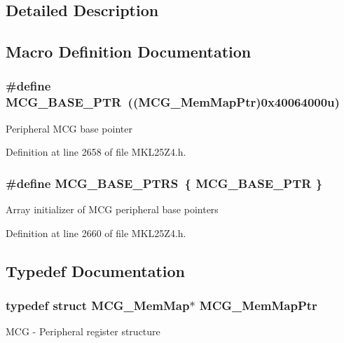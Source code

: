 \subsection{Detailed Description}


\subsection{Macro Definition Documentation}
\subsubsection[{\texorpdfstring{M\+C\+G\+\_\+\+B\+A\+S\+E\+\_\+\+P\+TR}{MCG_BASE_PTR}}]{\setlength{\rightskip}{0pt plus 5cm}\#define M\+C\+G\+\_\+\+B\+A\+S\+E\+\_\+\+P\+TR~(({\bf M\+C\+G\+\_\+\+Mem\+Map\+Ptr})0x40064000u)}\hypertarget{group___m_c_g___peripheral_gaceefc72e93a47a35f59a31c57dddf41b}{}\label{group___m_c_g___peripheral_gaceefc72e93a47a35f59a31c57dddf41b}
Peripheral M\+CG base pointer 

Definition at line 2658 of file M\+K\+L25\+Z4.\+h.

\subsubsection[{\texorpdfstring{M\+C\+G\+\_\+\+B\+A\+S\+E\+\_\+\+P\+T\+RS}{MCG_BASE_PTRS}}]{\setlength{\rightskip}{0pt plus 5cm}\#define M\+C\+G\+\_\+\+B\+A\+S\+E\+\_\+\+P\+T\+RS~\{ {\bf M\+C\+G\+\_\+\+B\+A\+S\+E\+\_\+\+P\+TR} \}}\hypertarget{group___m_c_g___peripheral_ga3e6aec328b7327acc1f7bff70bec388c}{}\label{group___m_c_g___peripheral_ga3e6aec328b7327acc1f7bff70bec388c}
Array initializer of M\+CG peripheral base pointers 

Definition at line 2660 of file M\+K\+L25\+Z4.\+h.



\subsection{Typedef Documentation}
\subsubsection[{\texorpdfstring{M\+C\+G\+\_\+\+Mem\+Map\+Ptr}{MCG_MemMapPtr}}]{\setlength{\rightskip}{0pt plus 5cm}typedef struct {\bf M\+C\+G\+\_\+\+Mem\+Map}$\ast$ {\bf M\+C\+G\+\_\+\+Mem\+Map\+Ptr}}\hypertarget{group___m_c_g___peripheral_ga1cb93dd00863c129e7753ec45a7c3563}{}\label{group___m_c_g___peripheral_ga1cb93dd00863c129e7753ec45a7c3563}
M\+CG -\/ Peripheral register structure 